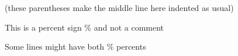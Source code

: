 \documentclass{article}
\begin{document}
(these parentheses
make the middle line here
indented as usual)



This is a percent sign \% and not a comment

Some lines might have both \% percents %
\end{document}
